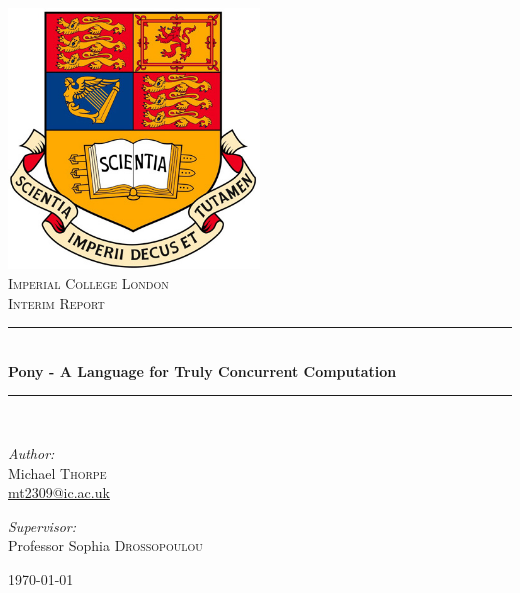\documentclass[pdftex,11pt,a4paper]{report}
\newcommand{\HRule}{\rule{\linewidth}{0.5mm}}
\begin{document}
\begin{titlepage}

\begin{center}

\includegraphics[width=0.50\textwidth]{imperial_crest_colour.jpg}\\[1cm]

\textsc{\LARGE Imperial College London}\\[1.5cm]

\textsc{\Large Interim Report}\\[0.5cm]


\HRule \\[0.4cm]
{ \huge \bfseries Pony - A Language for Truly Concurrent Computation}\\[0.4cm]

\HRule \\[1.5cm]

\begin{minipage}{0.4\textwidth}
\begin{flushleft} \large
\emph{Author:}\\
Michael \textsc{Thorpe}\\
\href{mailto:mt2309@ic.ac.uk}{mt2309@ic.ac.uk}
\end{flushleft}
\end{minipage}
\begin{minipage}{0.4\textwidth}
\begin{flushright} \large
\emph{Supervisor:} \\
Professor Sophia \textsc{Drossopoulou}
\end{flushright}
\end{minipage}

\vfill

{\large \today}

\end{center}

\end{titlepage}
\end{document}
